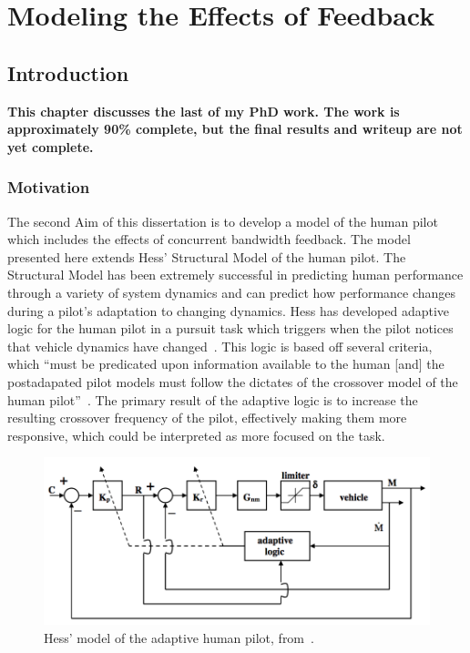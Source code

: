 \chapter{Modeling the Effects of Feedback}
\label{chapter:modeling}


\section{Introduction}
\textbf{\color{red} This chapter discusses the last of my PhD work.
    The work is approximately 90\% complete, but the final results and writeup are not yet complete.}

\subsection{Motivation}
The second Aim of this dissertation is to develop a model of the human pilot which includes the effects of concurrent bandwidth feedback.
The model presented here extends Hess' Structural Model of the human pilot.
The Structural Model has been extremely successful in predicting human performance through a variety of system dynamics and can predict how performance changes during a pilot's adaptation to changing dynamics.
Hess has developed adaptive logic for the human pilot in a pursuit task which triggers when the pilot notices that vehicle dynamics have changed~\citep{hess_modeling_2009}.
This logic is based off several criteria, which ``must be predicated upon information available to the human [and] the postadapated pilot models must follow the dictates of the crossover model of the human pilot''~\citep{hess_modeling_2009}.
The primary result of the adaptive logic is to increase the resulting crossover frequency of the pilot, effectively making them more responsive, which could be interpreted as more focused on the task.

\begin{figure}[tb]
    \begin{center}
        \includegraphics[width=0.8\linewidth]{figures/Modeling/Screen_Shot_2018-08-09_at_4_15_24_PM.png}
        \caption[Hess' model of the adaptive human pilot]{Hess' model of the adaptive human pilot, from~\citet{hess_modeling_2009}.}
        \label{figure:hesspursuit}
    \end{center}
\end{figure}

